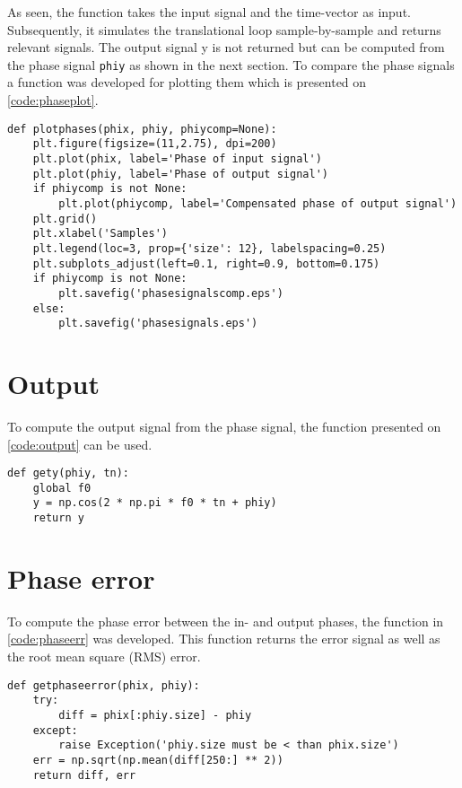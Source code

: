 As seen, the function takes the input signal and the time-vector as input. Subsequently, it simulates the translational loop sample-by-sample and returns relevant signals. The output signal y is not returned but can be computed from the phase signal \texttt{phiy} as shown in the next section. To compare the phase signals a function was developed for plotting them which is presented on \cref{code:phaseplot}.

\lstset{language=python,caption=Function for plotting phase signals,label=code:phaseplot}
\begin{lstlisting}
def plotphases(phix, phiy, phiycomp=None):
    plt.figure(figsize=(11,2.75), dpi=200)   
    plt.plot(phix, label='Phase of input signal')
    plt.plot(phiy, label='Phase of output signal')
    if phiycomp is not None:
        plt.plot(phiycomp, label='Compensated phase of output signal')
    plt.grid()
    plt.xlabel('Samples')
    plt.legend(loc=3, prop={'size': 12}, labelspacing=0.25)
    plt.subplots_adjust(left=0.1, right=0.9, bottom=0.175)
    if phiycomp is not None:
        plt.savefig('phasesignalscomp.eps') 
    else:
        plt.savefig('phasesignals.eps') 
\end{lstlisting}


\section{Output}
To compute the output signal from the phase signal, the function presented on \cref{code:output} can be used.

\lstset{language=python,caption=Function for generation output signal,label=code:output}
\begin{lstlisting}
def gety(phiy, tn):
    global f0
    y = np.cos(2 * np.pi * f0 * tn + phiy)
    return y
\end{lstlisting}


\section{Phase error}
To compute the phase error between the in- and output phases, the function in \cref{code:phaseerr} was developed. This function returns the error signal as well as the root mean square (RMS) error.

\lstset{language=python,caption=Function for computing phase errors,label=code:phaseerr}
\begin{lstlisting}
def getphaseerror(phix, phiy):
    try:
        diff = phix[:phiy.size] - phiy
    except:
        raise Exception('phiy.size must be < than phix.size')
    err = np.sqrt(np.mean(diff[250:] ** 2))
    return diff, err
\end{lstlisting}

